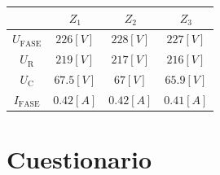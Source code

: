 \documentclass[letter,11pt]{article}
\begin{document}
\begin{center}
    \begin{tabular}{|c||c|c|c|}
    \hline
    & $Z_{1}$ & $Z_{2}$ & $Z_{3}$
    \tabularnewline \hline \hline
    $U_{\text{FASE}}$ & $226[V]$ & $228[V]$ & $227[V]$
    \tabularnewline \hline
    $U_{\text{R}}$ & $219[V]$ & $217[V]$ & $216[V]$
    \tabularnewline \hline
    $U_{\text{C}}$ & $67.5[V]$ & $67[V]$ & $65.9[V]$
    \tabularnewline \hline
    $I_{\text{FASE}}$ & $0.42[A]$ & $0.42[A]$ & $0.41[A]$
    \tabularnewline \hline
    \end{tabular}
\end{center}

\section{Cuestionario}
\end{document}
